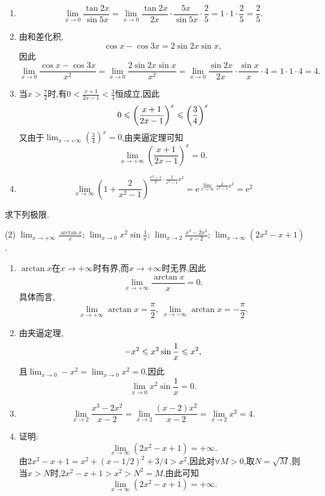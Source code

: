 \begin{solution}
    \begin{enumerate}[(1)]
        \item $$\lim_{x \to 0} \frac{\tan 2x}{\sin 5x} = \lim_{x \to 0} \frac{\tan 2x}{2x} \cdot \frac{5x}{\sin 5x} \cdot \frac{2}{5} = 1 \cdot 1 \cdot \frac{2}{5} = \frac{2}{5}.$$
        \item 由和差化积,$$ \cos x - \cos 3x = 2 \sin 2x \sin x,$$因此$$\lim_{x \to 0} \frac{\cos x - \cos 3x}{x^2} = \lim_{x \to 0} \frac{2 \sin 2x \sin x}{x^2} = \lim_{x \to 0} \frac{\sin 2x}{2x} \cdot \frac{\sin x}{x} \cdot 4 = 1 \cdot 1 \cdot 4 = 4.$$
        \item 当$x>\frac{7}{2}$时,有$0<\frac{x+1}{2x-1}<\frac{3}{4}$恒成立,因此$$0\leqslant\left(\frac{x+1}{2x-1}\right)^x\leqslant\left(\frac{3}{4}\right)^x$$
        又由于$\lim_{x \to +\infty} \left(\frac{3}{4}\right)^x = 0$,由夹逼定理可知$$\lim_{x \to +\infty} \left(\frac{x+1}{2x-1}\right)^x = 0.$$
        \item $$
                  \lim_{x \to \infty} \left(1 + \frac{2}{x^2 - 1}\right)^{\frac{x^2 - 1}{2} \cdot \frac{2}{x^2 - 1} x^2} = \mathrm{e}^{\lim_{x \to \infty} \frac{2}{x^2 - 1} x^2} = \mathrm{e}^2
              $$
    \end{enumerate}
\end{solution}

\begin{exercise}[1.3.10]
    求下列极限.
    \begin{tasks}[label=(\arabic*)](2)
        \task $\lim_{x \to +\infty} \frac{\arctan x}{x}$;
        \task $\lim_{x \to 0} x^2 \sin\frac{1}{x}$;
        \task $\lim_{x \to 2} \frac{x^3-2x^2}{x-2}$;
        \task $\lim_{x \to \infty} (2x^2 - x + 1)$.
    \end{tasks}
\end{exercise}

\begin{solution}
    \begin{enumerate}[(1)]
        \item $\arctan x$在$x \to +\infty$时有界,而$x \to +\infty$时无界,因此$$\lim_{x \to +\infty} \frac{\arctan x}{x} = 0.$$具体而言,$$\lim_{x \to + \infty} \arctan x = \frac{\pi}{2} , \ \lim_{x \to -\infty} \arctan x = -\frac{\pi}{2}.$$
        \item 由夹逼定理,$$-x^2 \leqslant x^2 \sin \frac{1}{x} \leqslant x^2,$$且$\lim_{x \to 0} -x^2 = \lim_{x \to 0} x^2 = 0$,因此$$\lim_{x \to 0} x^2 \sin\frac{1}{x} = 0.$$
        \item $$\lim_{x \to 2} \frac{x^3-2x^2}{x-2} = \lim_{x \to 2} \frac{(x-2)x^2}{x-2} = \lim_{x \to 2}x^2  = 4.$$
        \item 证明: $$\lim_{x \to \infty} (2x^2 - x + 1) = +\infty.$$
              由$2x^2 - x + 1 = x^2 + (x - 1/2)^2 + 3/4 > x^2$,因此对$\forall M > 0$,取$N = \sqrt{M}$,则当$x > N$时,$2x^2 - x + 1 > x^2 > N^2 = M$.由此可知$$\lim_{x \to \infty} (2x^2 - x + 1) = +\infty.$$
    \end{enumerate}
\end{solution}

